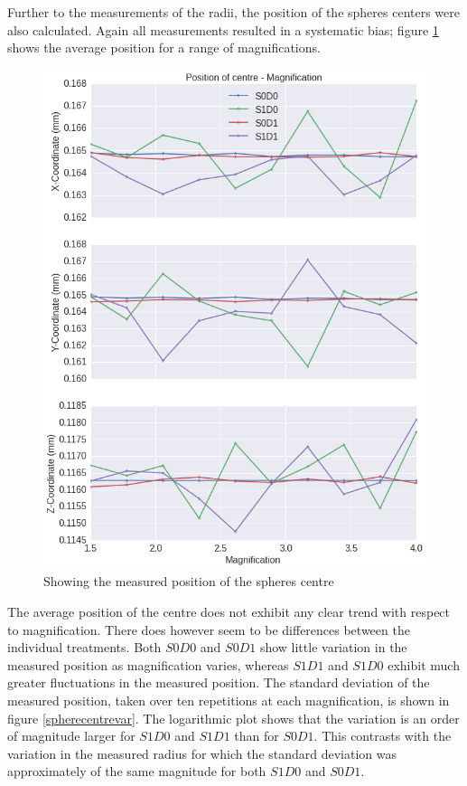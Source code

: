 \documentclass[
  twoside,
  11pt, a4paper,
  footinclude=true,
  headinclude=true,
  cleardoublepage=empty
]{scrbook}
\begin{document}
Further to the measurements of the radii, the position of the spheres centers were also calculated. Again all measurements resulted in a systematic bias; figure \ref{spherecentre} shows the average position for a range of magnifications.

\begin{figure}[h!]
  \centering
    \includegraphics[width=\textwidth]{figures/output_18_0.png}
    \caption{Showing the measured position of the spheres centre}
        \label{spherecentre}
\end{figure}

The average position of the centre does not exhibit any clear trend with respect to magnification. There does however seem to be differences between the individual treatments. Both $S0D0$ and $S0D1$ show little variation in the measured position as magnification varies, whereas $S1D1$ and $S1D0$ exhibit much greater fluctuations in the measured position. The standard deviation of the measured position, taken over ten repetitions at each magnification, is shown in figure \ref{spherecentrevar}. The logarithmic plot shows that the variation is an order of magnitude larger for $S1D0$ and $S1D1$ than for $S0D1$. This contrasts with the variation in the measured radius for which the standard deviation was approximately of the same magnitude for both $S1D0$ and $S0D1$.
\end{document}
